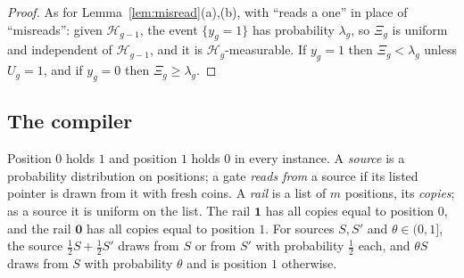 \documentclass[11pt]{amsart}
\theoremstyle{definition}
\theoremstyle{remark}
\begin{document}
\begin{proof}
As for Lemma~\ref{lem:misread}(a),(b), with ``reads a one'' in place of ``misreads'': given
$\mathcal H_{g-1}$, the event $\{y_g=1\}$ has probability $\lambda_g$, so $\Xi_g$ is uniform and
independent of $\mathcal H_{g-1}$, and it is $\mathcal H_g$-measurable. If $y_g=1$ then
$\Xi_g<\lambda_g$ unless $U_g=1$, and if $y_g=0$ then $\Xi_g\ge\lambda_g$.
\end{proof}

\subsection{The compiler}

Position $0$ holds $1$ and position $1$ holds $0$ in every instance. A \emph{source} is a
probability distribution on positions; a gate \emph{reads from} a source if its listed pointer is
drawn from it with fresh coins. A \emph{rail} is a list of $m$ positions, its \emph{copies}; as a
source it is uniform on the list. The rail $\mathbf 1$ has all copies equal to position $0$, and
the rail $\mathbf 0$ has all copies equal to position $1$. For sources $S,S'$ and
$\theta\in(0,1]$, the source $\frac12S+\frac12S'$ draws from $S$ or from $S'$ with probability
$\frac12$ each, and $\theta S$ draws from $S$ with probability $\theta$ and is position $1$
otherwise.
\end{document}
